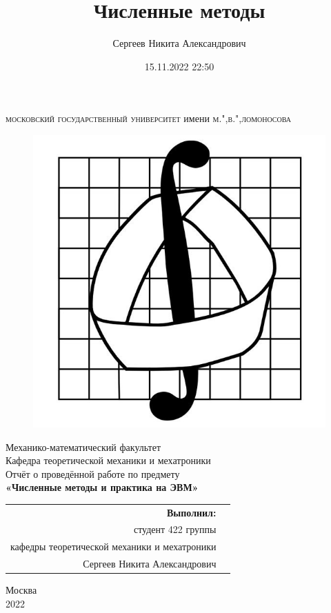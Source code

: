 \documentclass[a4paper,12pt,oneside]{article}
\title{Численные методы}
\author{Сергеев Никита Александрович}
\date{15.11.2022 22:50}
\numberwithin{equation}{section}
\numberwithin{table}{section}
\numberwithin{figure}{section}
\begin{document}
\setlength{\abovedisplayskip}{3pt plus 3pt minus 2pt}
\setlength{\abovedisplayshortskip}{3pt plus 2pt minus 3pt}
\setlength{\belowdisplayskip}{3pt plus 3pt minus 2pt}
\setlength{\belowdisplayshortskip}{3pt plus 2pt minus 3pt}
\setlength{\textfloatsep}{1em plus .4em minus .3em}
\setlength{\abovecaptionskip}{0.5em plus .4em minus .1em}
\setlength{\belowcaptionskip}{0.5em plus .4em minus .1em}
\begin{titlepage}
\thispagestyle{empty}
\begin{center}
\LARGE{\textsc{московский государственный университет}} имени \LARGE{\textsc{м.",в.",ломоносова}}\\
\begin{figure}[h]
\centering
\includegraphics[scale=0.2]{emb.jpg}
\end{figure}
\normalsize Механико-математический факультет\\
\normalsize Кафедра теоретической механики и мехатроники\\
\vspace{4cm}
\Large
Отчёт о проведённой работе по предмету\\
\LARGE{\textbf{«Численные методы и практика на ЭВМ»}}\\[.4em]
\vspace{7cm}
\normalsize
\begin{flushright}
\begin{tabular}{rl}
\textbf{Выполнил:}\\
студент 422 группы\\
кафедры теоретической механики и мехатроники\\
Сергеев Никита Александрович
\end{tabular}
\end{flushright}
\vspace{0.5cm}
\vfill
\vspace{1cm}
{Москва\\
2022}
\end{center}
\end{titlepage}
\end{document}
